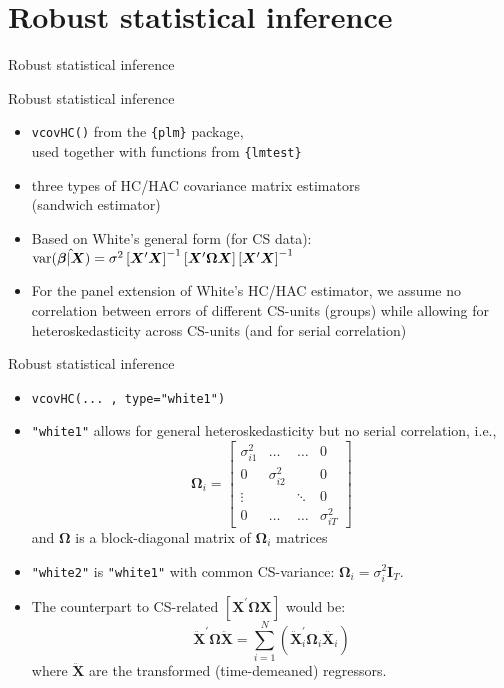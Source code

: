 \documentclass{beamer}
\begin{document}
\section{Robust statistical inference}
\begin{frame}{Robust statistical inference}
\end{frame}
\begin{frame}{Robust statistical inference}
\begin{itemize}
    \item \texttt{vcovHC()} from the \texttt{\{plm\}} package, 
    \\used together with functions from \texttt{\{lmtest\}}
    \smallskip
    \item three types of HC/HAC covariance matrix estimators \\(sandwich estimator)
    \smallskip
    \item Based on White's general form (for CS data):\\ \medskip 
    $\textnormal{var}(\hat{\bm{\beta}|\bm{X}})= \sigma^2
    \left[ \bm{X}^{\prime} \bm{X} \right]^{-1}
    \left[ \bm{X}^{\prime} \bm{\Omega} \bm{X} \right]
    \left[ \bm{X}^{\prime} \bm{X} \right]^{-1}$ \\ \medskip
    \smallskip
    \item For the panel extension of White's HC/HAC estimator, we assume no correlation between errors of different CS-units (groups) while allowing for heteroskedasticity across CS-units (and for serial correlation)
\end{itemize}
\end{frame}
\begin{frame}{Robust statistical inference}
\begin{itemize}
    \item \texttt{vcovHC(... , type="white1")}
    \medskip
    \item \texttt{"white1"} allows for general heteroskedasticity but no serial correlation, i.e.,
    $$
    \bm{\Omega}_i = 
    \begin{bmatrix}
    \sigma_{i1}^2 & \dots & \dots & 0 \\
    0 & \sigma_{i2}^2 &  & 0 \\
    \vdots & & \ddots & 0 \\
    0 & \dots & \dots & \sigma_{iT}^2
    \end{bmatrix}
    $$
    and $\bm{\Omega}$ is a block-diagonal matrix of $\bm{\Omega}_i$ matrices
    \smallskip
    \item \texttt{"white2"} is \texttt{"white1"} with common CS-variance: $\bm{\Omega}_i = \sigma^2_i \bm{I}_T$.
    \smallskip
    \item The counterpart to CS-related $\left[ \bm{X}^{\prime} \bm{\Omega} \bm{X} \right]$ would be:
    $$
    \ddot{\bm{X}}^{\prime} \bm{\Omega} \ddot{\bm{X}} = 
    \sum_{i=1}^N \left( 
    \ddot{\bm{X}}_i^{\prime} \bm{\Omega}_i \ddot{\bm{X}_i}
    \right)
    $$
    where $\ddot{\bm{X}}$ are the transformed (time-demeaned) regressors.
\end{itemize}
\end{frame}
\end{document}

